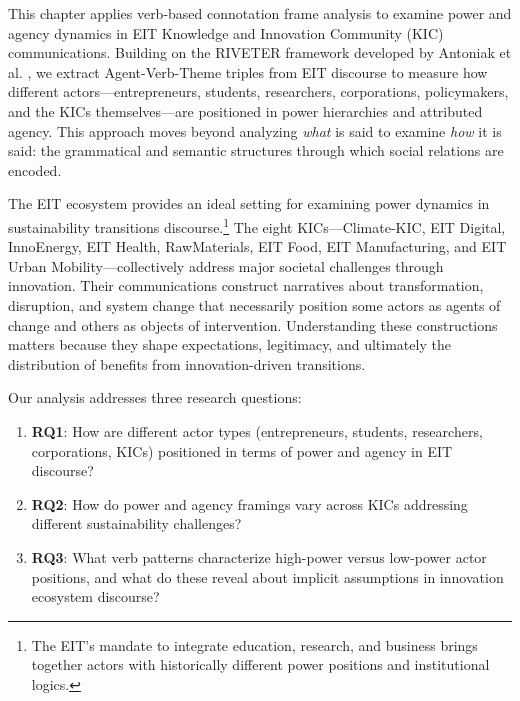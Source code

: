 \documentclass[../main.tex]{subfiles}
\begin{document}
This chapter applies verb-based connotation frame analysis to examine power and agency dynamics in EIT Knowledge and Innovation Community (KIC) communications. Building on the RIVETER framework developed by Antoniak et al. \cite{antoniak2023riveter}, we extract Agent-Verb-Theme triples from EIT discourse to measure how different actors---entrepreneurs, students, researchers, corporations, policymakers, and the KICs themselves---are positioned in power hierarchies and attributed agency. This approach moves beyond analyzing \textit{what} is said to examine \textit{how} it is said: the grammatical and semantic structures through which social relations are encoded.

The EIT ecosystem provides an ideal setting for examining power dynamics in sustainability transitions discourse.\footnote{The EIT's mandate to integrate education, research, and business brings together actors with historically different power positions and institutional logics.} The eight KICs---Climate-KIC, EIT Digital, InnoEnergy, EIT Health, RawMaterials, EIT Food, EIT Manufacturing, and EIT Urban Mobility---collectively address major societal challenges through innovation. Their communications construct narratives about transformation, disruption, and system change that necessarily position some actors as agents of change and others as objects of intervention. Understanding these constructions matters because they shape expectations, legitimacy, and ultimately the distribution of benefits from innovation-driven transitions.

Our analysis addresses three research questions:

\begin{enumerate}
    \item \textbf{RQ1}: How are different actor types (entrepreneurs, students, researchers, corporations, KICs) positioned in terms of power and agency in EIT discourse?
    \item \textbf{RQ2}: How do power and agency framings vary across KICs addressing different sustainability challenges?
    \item \textbf{RQ3}: What verb patterns characterize high-power versus low-power actor positions, and what do these reveal about implicit assumptions in innovation ecosystem discourse?
\end{enumerate}
\end{document}
